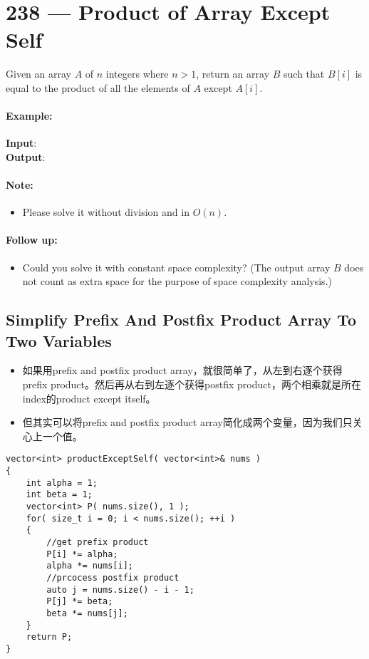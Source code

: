 \section{238 --- Product of Array Except Self}
Given an array $A$ of $n$ integers where $n > 1$,  return an array $B$ such that $ B[i] $ is equal to the product of all the elements of $A$ except $A[i]$.

\paragraph{Example:}
\begin{flushleft}
\textbf{Input}:  \fcj{[1,2,3,4]}
\\
\textbf{Output}: \fcj{[24,12,8,6]}
\end{flushleft}

\paragraph{Note:}
\begin{itemize}
\item Please solve it without division and in $ O(n) $.
\end{itemize}

\paragraph{Follow up:}
\begin{itemize}
\item Could you solve it with constant space complexity? (The output array $B$ does not count as extra space for the purpose of space complexity analysis.)
\end{itemize}
\subsection{Simplify Prefix And Postfix Product Array To Two Variables}
\begin{itemize}
\item 如果用prefix and postfix product array，就很简单了，从左到右逐个获得prefix product。然后再从右到左逐个获得postfix product，两个相乘就是所在index的product except itself。
\item 但其实可以将prefix and postfix product array简化成两个变量，因为我们只关心上一个值。
\end{itemize}

\setcounter{lstlisting}{0}
\begin{lstlisting}[style=customc, caption={Prefix And Postfix Product}]
vector<int> productExceptSelf( vector<int>& nums )
{
    int alpha = 1;
    int beta = 1;
    vector<int> P( nums.size(), 1 );
    for( size_t i = 0; i < nums.size(); ++i )
    {
        //get prefix product
        P[i] *= alpha;
        alpha *= nums[i];
        //prcocess postfix product
        auto j = nums.size() - i - 1;
        P[j] *= beta;
        beta *= nums[j];
    }
    return P;
}
\end{lstlisting}